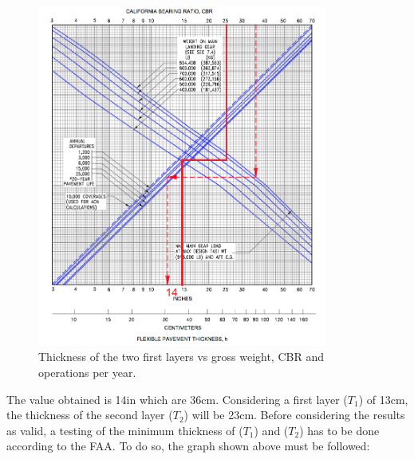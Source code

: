 		\begin{figure}[H]
			\centering
			\includegraphics[clip, trim=0cm 0cm 0cm 0cm, width=0.85\textwidth]{./images/pavement/B777/thickness2}
			\caption{Thickness of the two first layers vs gross weight, CBR and operations per year.}
			\label{} %
		\end{figure}
		
		The value obtained is 14in which are 36cm. Considering a first layer (\(T_1\)) of 13cm, the thickness of the second layer (\(T_2\)) will be 23cm. Before considering the results as valid, a testing of the minimum thickness of (\(T_1\)) and (\(T_2\)) has to be done according to the FAA. To do so, the graph shown above must be followed:
		

